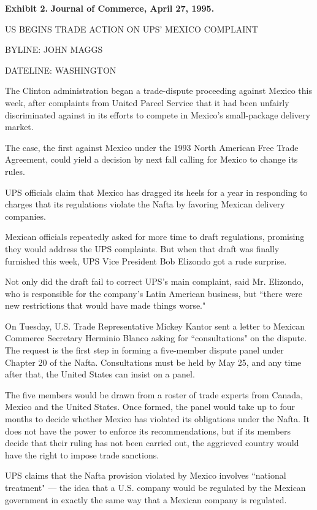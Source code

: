 \documentclass[letterpaper,12pt]{article}
\begin{document}
\newpage
{\bf Exhibit 2.} {\bf Journal of Commerce, April 27, 1995.}

US BEGINS TRADE ACTION ON UPS' MEXICO COMPLAINT

BYLINE: JOHN MAGGS

DATELINE: WASHINGTON

The Clinton administration began a trade-dispute proceeding against
Mexico this week, after complaints from United Parcel Service that
it had been unfairly discriminated against in its efforts to compete
in Mexico's small-package delivery market.

The case, the first against Mexico under the 1993 North American
Free Trade Agreement, could yield a decision by next fall calling
for Mexico to change its rules.

UPS officials claim that Mexico has dragged its heels for a year in
responding to charges that its regulations violate the Nafta by
favoring Mexican delivery companies.

Mexican officials repeatedly asked for more time to draft
regulations, promising they would address the UPS complaints. But
when that draft was finally furnished this week, UPS Vice President
Bob Elizondo got a rude surprise.

Not only did the draft fail to correct UPS's main complaint, said
Mr. Elizondo, who is responsible for the company's Latin American
business, but ``there were new restrictions that would have made
things worse."

On Tuesday, U.S. Trade Representative Mickey Kantor sent a letter to
Mexican Commerce Secretary Herminio Blanco asking for
``consultations" on the dispute. The request is the first step in
forming a five-member dispute panel under Chapter 20 of the Nafta.
Consultations must be held by May 25, and any time after that, the
United States can insist on a panel.

The five members would be drawn from a roster of trade experts from
Canada, Mexico and the United States. Once formed, the panel would
take up to four months to decide whether Mexico has violated its
obligations under the Nafta. It does not have the power to enforce
its recommendations, but if its members decide that their ruling has
not been carried out, the aggrieved country would have the right to
impose trade sanctions.

UPS claims that the Nafta provision violated by Mexico involves
``national treatment" --- the idea that a U.S. company would be
regulated by the Mexican government in exactly the same way that a
Mexican company is regulated.
\end{document}
